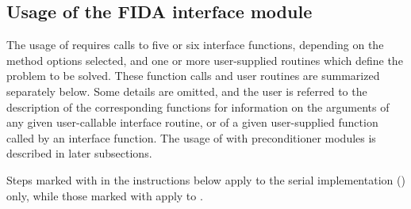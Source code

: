 \subsection{Usage of the FIDA interface module}\label{ss:fida_usage}

The usage of {\fida} requires calls to five or six interface
functions, depending on the method options selected, and one or more
user-supplied routines which define the problem to be solved.  These
function calls and user routines are summarized separately below.
Some details are omitted, and the user is referred to the description
of the corresponding {\ida} functions for information on the arguments 
of any given user-callable interface routine, or of a given user-supplied 
function called by an interface function.
The usage of {\fida} with preconditioner modules is described in later
subsections.

Steps marked with {\s} in the instructions below apply to the serial
{\nvector} implementation ({\nvecs}) only, while those marked with {\p}
apply to {\nvecp}.

